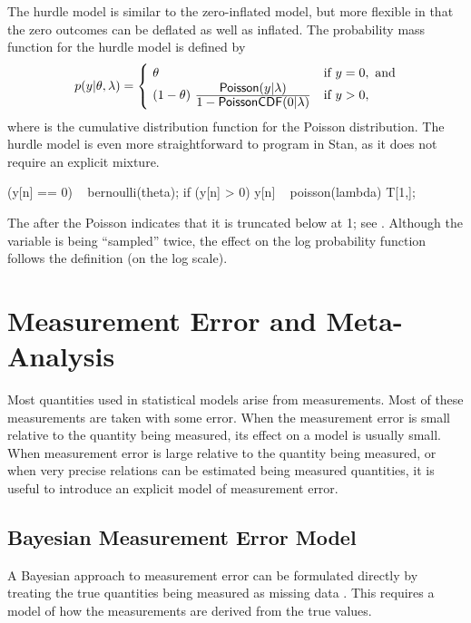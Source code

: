 The hurdle model is similar to the zero-inflated model, but more
flexible in that the zero outcomes can be deflated as well as
inflated.  The probability mass function for the hurdle model is
defined by 
%
\[
p(y|\theta,\lambda)
= 
\begin{cases}
\ \theta & \mbox{if } y = 0, \mbox{ and}
\\
\ (1 - \theta)
  \
   \frac{\displaystyle \distro{Poisson}(y | \lambda)}
        {\displaystyle \vspace*{8pt} 1 - \distro{PoissonCDF}(0 | \lambda)}
& \mbox{if } y > 0,
\end{cases}
\]
%
where  is the cumulative distribution function for
the Poisson distribution.  The hurdle model is even more straightforward to
program in Stan, as it does not require an explicit mixture.  
%
\begin{stancode}
(y[n] == 0) ~ bernoulli(theta);
if (y[n] > 0)
  y[n] ~ poisson(lambda) T[1,];
\end{stancode}
%
The \code{[1,]} after the Poisson indicates that it is truncated below
at 1; see \refsection{poisson}.  Although the variable 
 is being ``sampled'' twice, the effect on the log
probability function follows the definition (on the log scale).  


\chapter{Measurement Error and Meta-Analysis}

\noindent
Most quantities used in statistical models arise from measurements.
Most of these measurements are taken with some error.  When the
measurement error is small relative to the quantity being measured,
its effect on a model is usually small.  When measurement error is
large relative to the quantity being measured, or when very precise
relations can be estimated being measured quantities, it is useful to
introduce an explicit model of measurement error.


\section{Bayesian Measurement Error Model}

A Bayesian approach to measurement error can be formulated directly by
treating the true quantities being measured as missing data
\citep{Clayton:1992, RichardsonGilks:1993}.  This requires a model of
how the measurements are derived from the true values.

